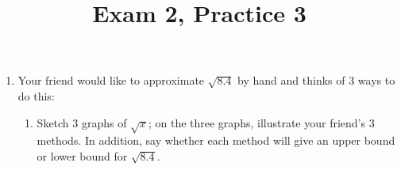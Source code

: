 \documentclass{article}
\theoremstyle{theorem}
\begin{document}
  \title{Exam 2, Practice 3}


\listofproblems

\begin{enumerate}
\item {} 

  Your friend would like to approximate $\sqrt{8.4}$ by hand and thinks of 3 ways to do this:

  \begin{enumerate}
  \item
    \begin{problem}[\vfill]
      Sketch 3 graphs of $\sqrt{x}$; on the three graphs, illustrate your friend's 3 methods.
      In addition, say whether each method will give an upper bound or
      lower bound for $\sqrt{8.4}$.
    \end{problem}


\end{enumerate}
\end{enumerate}
\end{document}
